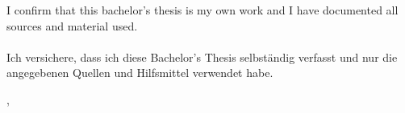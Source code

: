 \thispagestyle{empty}
\vspace*{0.65\textheight}
\noindent
I confirm that this bachelor's thesis is my own work and I have documented all sources and material used. \\\\
Ich versichere, dass ich diese Bachelor's Thesis selbständig verfasst und nur die angegebenen Quellen und Hilfsmittel verwendet habe.

\vspace{15mm}
\noindent
\getSubmissionLocation{}, \getSubmissionDate{} \hspace{5cm} \getAuthor{}

\cleardoublepage{}
